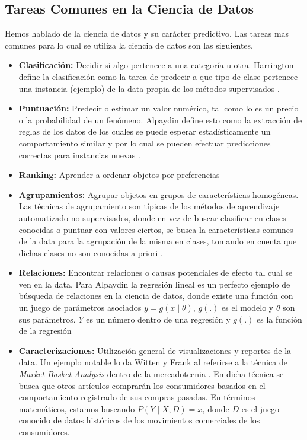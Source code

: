 \subsection{Tareas Comunes en la Ciencia de Datos}
Hemos hablado de la ciencia de datos y su carácter predictivo. Las tareas mas comunes para lo cual se utiliza la ciencia de datos son las siguientes.

\begin{itemize}
	\item \textbf{Clasificación:} Decidir si algo pertenece a una categoría u otra. Harrington define la clasificación como la tarea de predecir a que tipo de clase pertenece una instancia (ejemplo) de la data propia de los métodos supervisados \cite{harrington}.
	\item \textbf{Puntuación:} Predecir o estimar un valor numérico, tal como lo es un precio o la probabilidad de un fenómeno. Alpaydin define esto como la extracción de reglas de los datos de los cuales se puede esperar estadísticamente un comportamiento similar y por lo cual se pueden efectuar predicciones correctas para instancias nuevas \cite{alpaydin}.
	\item \textbf{Ranking:} Aprender a ordenar objetos por preferencias
	\item \textbf{Agrupamientos:} Agrupar objetos en grupos de características homogéneas. Las técnicas de agrupamiento son típicas de los métodos de aprendizaje automatizado no-supervisados, donde en vez de buscar clasificar en clases conocidas o puntuar con valores ciertos, se busca la características comunes de la data para la agrupación de la misma en clases, tomando en cuenta que dichas clases no son conocidas a priori \cite{harrington}. 
	\item \textbf{Relaciones:} Encontrar relaciones o causas potenciales de efecto tal cual se ven en la data. Para Alpaydin la regresión lineal es un perfecto ejemplo de búsqueda de relaciones en la ciencia de datos, donde existe una función con un juego de parámetros asociados $y = g(x \mid \theta)$, $g(.)$ es el modelo y $\theta$ son sus parámetros. $Y$ es un número dentro de una regresión y $g(.)$ es la función de la regresión \cite{alpaydin}
	\item \textbf{Caracterizaciones:} Utilización general de visualizaciones y reportes de la data. Un ejemplo notable lo da Witten y Frank al referirse a la técnica de \emph{Market Basket Analysis} dentro de la mercadotecnia \cite{datamining}. En dicha técnica se busca que otros artículos comprarán los consumidores basados en el comportamiento registrado de sus compras pasadas. En términos matemáticos, estamos buscando $P(Y \mid X,D) = x_i$ donde $D$ es el juego conocido de datos históricos de los movimientos comerciales de los consumidores. 
\end{itemize}
